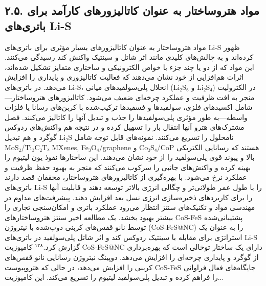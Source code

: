 \documentclass[12pt,a4paper,twocolumn]{article} %
\newcommand{\persian}[1]{\textfarsi{#1}}
\newcommand{\english}[1]{\textenglish{#1}}
\begin{document}
\subsection*{\persian{۲.۵. مواد هتروساختار به عنوان کاتالیزورهای کارآمد برای باتری‌های \english{Li-S}}}
\persian{
مواد هتروساختار به عنوان کاتالیزورهای بسیار مؤثری برای باتری‌های \english{Li-S} ظهور کرده‌اند و به چالش‌های کلیدی مانند اثر شاتل و سینتیک واکنش کند رسیدگی می‌کنند. این مواد که از دو یا چند جزء با خواص الکترونیکی و ساختاری متمایز تشکیل شده‌اند، اثرات هم‌افزایی از خود نشان می‌دهند که فعالیت کاتالیزوری و پایداری را افزایش می‌دهد. در باتری‌های \english{Li-S}، انحلال پلی‌سولفیدهای میانی (\english{Li₂S₆} و \english{Li₂S₄}) در الکترولیت منجر به افت ظرفیت و عملکرد چرخه‌ای ضعیف می‌شود. کاتالیزورهای هتروساختار—شامل اکسیدهای فلزی، سولفیدها و فسفیدها ترکیب‌شده با کربن‌های رسانا یا فلزات واسطه—به طور مؤثری پلی‌سولفیدها را جذب و تبدیل آنها را کاتالیز می‌کنند. فصل مشترک‌های هترو آنها انتقال بار را تسهیل کرده و در نتیجه هم واکنش‌های ردوکس گوگرد و هم تبدیل \english{Li₂S} نامحلول را تسریع می‌کنند. نمونه‌های قابل توجه شامل \english{MoS₂/Ti₃C₂Tₓ MXenes}, \english{Fe₃O₄/graphene} و \english{Co₃S₄/CoP} هستند که رسانایی الکتریکی بالا و پیوند قوی پلی‌سولفید را از خود نشان می‌دهند. این ساختارها نفوذ یون لیتیوم را بهینه کرده و واکنش‌های جانبی را سرکوب می‌کنند که منجر به بهبود حفظ ظرفیت و عملکرد نرخ می‌شود. با بهره‌گیری از کاتالیزورهای هتروساختار، محققان قصد دارند باتری‌های \english{Li-S} را با طول عمر طولانی‌تر و چگالی انرژی بالاتر توسعه دهند و قابلیت آنها را برای کاربردهای ذخیره‌سازی انرژی نسل بعد افزایش دهند. پیشرفت‌های مداوم در مهندسی مواد و تکنیک‌های سنتز انتظار می‌رود عملکرد باتری و امکان‌سنجی تجاری را بیشتر بهبود بخشد.
}
\persian{
یک مطالعه اخیر سنتز هتروساختارهای \english{CoS-FeS} پشتیبانی‌شده توسط نانو قفس‌های کربنی دوپ‌شده با نیتروژن (\english{CoS-FeS@NC}) را به عنوان یک استراتژی برای مقابله با سینتیک ردوکس کند و اثر شاتل پلی‌سولفید در باتری‌های \english{Li-S} گزارش کرد.$^{۱۴۸}$ کامپوزیت \english{CoS-FeS@NC} دارای یک ساختار توخالی است که بهره‌برداری از گوگرد و پایداری چرخه‌ای را افزایش می‌دهد. دوپینگ نیتروژن رسانایی نانو قفس‌های کربنی را افزایش می‌دهد، در حالی که هتروپیوست \english{CoS-FeS} جایگاه‌های فعال فراوانی را فراهم کرده و تبدیل پلی‌سولفید لیتیوم را تسریع می‌کند. این کامپوزیت...
}

\end{document}
